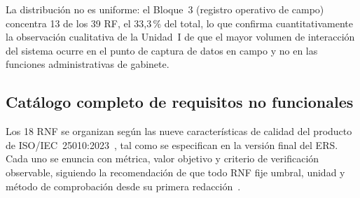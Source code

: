 \documentclass[11pt,a4paper]{article}
\begin{document}
La distribución no es uniforme: el Bloque~3 (registro operativo de campo) concentra 13 de los 39
RF, el 33{,}3\,\% del total, lo que confirma cuantitativamente la observación cualitativa de la
Unidad~I de que el mayor volumen de interacción del sistema ocurre en el punto de captura de datos
en campo y no en las funciones administrativas de gabinete.

\subsection{Catálogo completo de requisitos no funcionales}

Los 18 RNF se organizan según las nueve características de calidad del producto de
ISO/IEC~25010:2023~\cite{iso25010}, tal como se especifican en la versión final del ERS. Cada uno
se enuncia con métrica, valor objetivo y criterio de verificación observable, siguiendo la
recomendación de que todo RNF fije umbral, unidad y método de comprobación desde su primera
redacción~\cite{habibullah2023}.
\end{document}
